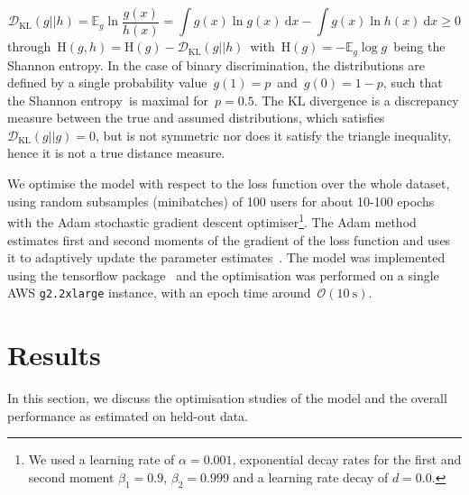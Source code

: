 \begin{equation}
\mathcal{D}_{\mathrm{KL}}(g||h) = \mathbb{E}_g \ln{\frac{g(x)}{h(x)}} = \int g(x) \ln{g(x)}\ \mathrm{d}x - \int g(x) \ln{h(x)}\ \mathrm{d}x \geq 0
\end{equation}
through~$\mathrm{H}(g,h) = \mathrm{H}(g) - \mathcal{D}_{\mathrm{KL}}(g||h)$~with~$\mathrm{H}(g) = -\mathbb{E}_g \log{g}$~being the Shannon entropy. In the case of binary discrimination, the distributions are defined by a single probability value~$g(1) = p$~and~$g(0) = 1 - p$, such that the Shannon entropy is maximal for~$p=0.5$. The KL divergence is a discrepancy measure between the true and assumed distributions, which satisfies~$\mathcal{D}_{\mathrm{KL}}(g||g) = 0$, but is not symmetric nor does it satisfy the triangle inequality, hence it is not a true distance measure.

We optimise the model with respect to the loss function over the whole dataset, using random subsamples (minibatches) of 100 users for about 10-100 epochs with the Adam stochastic gradient descent optimiser\footnote{We used a learning rate of $\alpha=0.001$, exponential decay rates for the first and second moment $\beta_1=0.9$, $\beta_2=0.999$ and a learning rate decay of $d=0.0$.}. The Adam method estimates first and second moments of the gradient of the loss function and uses it to adaptively update the parameter estimates~\cite{DBLP:journals/corr/KingmaB14}. The model was implemented using the tensorflow package~\cite{2016arXiv160304467A} and the optimisation was performed on a single AWS \texttt{g2.2xlarge} instance, with an epoch time around~$\mathcal{O}(10~\mathrm{s})$.

\section{Results}
\label{sec:lingvist_results}
In this section, we discuss the optimisation studies of the model and the overall performance as estimated on held-out data.

